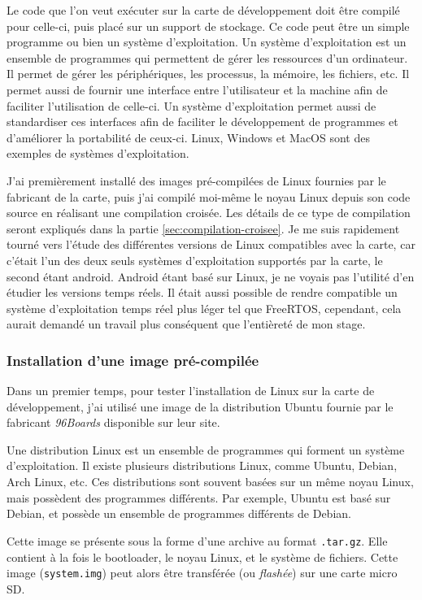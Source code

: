 Le code que l'on veut exécuter sur la carte de développement doit être compilé pour celle-ci, puis placé sur un support de stockage. Ce code peut être un simple programme ou bien un système d'exploitation. Un système d'exploitation est un ensemble de programmes qui permettent de gérer les ressources d'un ordinateur. Il permet de gérer les périphériques, les processus, la mémoire, les fichiers, etc. Il permet aussi de fournir une interface entre l'utilisateur et la machine afin de faciliter l'utilisation de celle-ci. Un système d'exploitation permet aussi de standardiser ces interfaces afin de faciliter le développement de programmes et d'améliorer la portabilité de ceux-ci. Linux, Windows et MacOS sont des exemples de systèmes d'exploitation.

J'ai premièrement installé des images pré-compilées de Linux fournies par le fabricant de la carte, puis j'ai compilé moi-même le noyau Linux depuis son code source en réalisant une compilation croisée. Les détails de ce type de compilation seront expliqués dans la partie \ref{sec:compilation-croisee}. Je me suis rapidement tourné vers l'étude des différentes versions de Linux compatibles avec la carte, car c'était l'un des deux seuls systèmes d'exploitation supportés par la carte, le second étant android. Android étant basé sur Linux, je ne voyais pas l'utilité d'en étudier les versions temps réels. Il était aussi possible de rendre compatible un système d'exploitation temps réel plus léger tel que FreeRTOS, cependant, cela aurait demandé un travail plus conséquent que l'entièreté de mon stage.

\subsubsection{Installation d'une image pré-compilée}

Dans un premier temps, pour tester l'installation de Linux sur la carte de développement, j'ai utilisé une image de la distribution Ubuntu fournie par le fabricant \textit{96Boards} disponible sur leur site. 

Une distribution Linux est un ensemble de programmes qui forment un système d'exploitation. Il existe plusieurs distributions Linux, comme Ubuntu, Debian, Arch Linux, etc. Ces distributions sont souvent basées sur un même noyau Linux, mais possèdent des programmes différents. Par exemple, Ubuntu est basé sur Debian, et possède un ensemble de programmes différents de Debian.

Cette image se présente sous la forme d'une archive au format \texttt{.tar.gz}. Elle contient à la fois le \gls{bootloader}, le noyau Linux, et le système de fichiers. Cette image (\texttt{system.img}) peut alors être transférée (ou \textit{flashée}) sur une carte micro SD. 

